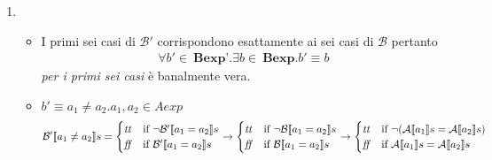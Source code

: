 {\begin{enumerate}[label=(\alph*)]
   =
  \caseFun{\semtrue}
          { < }
          {\semfalse}
          { \not < } \\ \\

   =
  \caseFun{\semtrue}
          { \geq {}}
          {\semfalse}
          { \not \geq {}} \\ \\

   = 
  \caseFun{\semtrue}
          { = \semfalse \ \mbox{ or } \
             = \semtrue}
          {\semfalse}
          { = \semtrue \ \mbox{ and } \ 
             = \semfalse} \\ \\

   =
  \caseFun{\semtrue}
          { = \Bext{b_2}}
          {\semfalse}
          {\Bext{b_1} \neq {}} \\ \\

\item
  \begin{itemize}
    \item I primi sei casi di $\mathcal{B'}$ corrispondono esattamente ai sei 
casi di $\mathcal{B}$ pertanto 
      \begin{align*}
        \forall b' \in \ \textbf{Bexp'}.\exists b \in 
        \ \textbf{Bexp}.b' \equiv b
      \end{align*}
      \textit{per i primi sei casi} è banalmente vera.
    \item $b' \equiv a_1 \neq a_2. a_1, a_2 \in Aexp$ \\ 
      \begin{align*}
        \mathcal{B'} \llbracket a_1 \neq a_2 \rrbracket s = 
        \begin{cases} 
          \mbox{\textit{tt}} & 
          \mbox{if} \ \lnot \mathcal{B'} \llbracket a_1 = a_2 \rrbracket s \\ 
          \mbox{\textit{ff}} & 
          \mbox{if}  \ \mathcal{B'} \llbracket a_1 = a_2 \rrbracket s\\
        \end{cases}
        \rightarrow
        \begin{cases} 
          \mbox{\textit{tt}} & 
          \mbox{if} \ \lnot \mathcal{B} \llbracket a_1 = a_2 \rrbracket s \\ 
          \mbox{\textit{ff}} & 
          \mbox{if}  \ \mathcal{B} \llbracket a_1 = a_2 \rrbracket s\\
        \end{cases}
        \rightarrow
        \begin{cases} 
          \mbox{\textit{tt}} & 
          \mbox{if} \ \lnot (\mathcal{A} \llbracket a_1 \rrbracket s = \mathcal{A} \llbracket a_2 \rrbracket s) \\ 
          \mbox{\textit{ff}} & 
          \mbox{if}  \ \mathcal{A} \llbracket a_1 \rrbracket s = \mathcal{A} \llbracket a_2 \rrbracket s\\
        \end{cases} 
      \end{align*}
    

\end{itemize}
\end{enumerate}}
